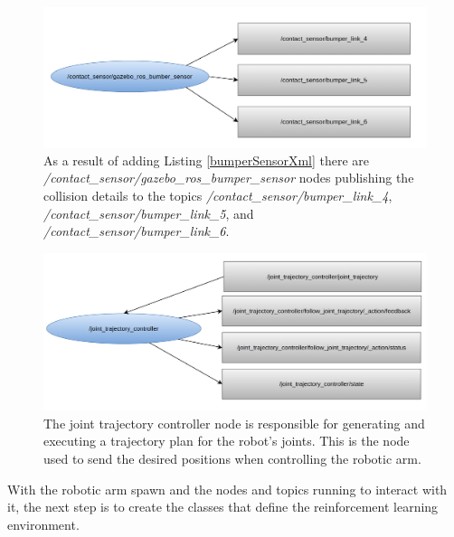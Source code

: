 \documentclass[12pt,oneside]{article}
\begin{document}
\begin{figure}[H]
\centering
\includegraphics[width=0.95\linewidth]{rosgraph03_new}
\caption{As a result of adding Listing \ref{bumperSensorXml} there are \textit{/contact\_sensor/gazebo\_ros\_bumper\_sensor} nodes publishing the collision details to the topics \textit{/contact\_sensor/bumper\_link\_4}, \textit{/contact\_sensor/bumper\_link\_5}, and\textit{ /contact\_sensor/bumper\_link\_6}. }
\label{fig:rosgraph03}
\end{figure}

\begin{figure}[H]
\centering
\includegraphics[width=0.95\linewidth]{rosgraph04_new}
\caption{The joint trajectory controller node is responsible for generating and executing a trajectory plan for the robot's joints. This is the node used to send the desired positions when controlling the robotic arm.}
\label{fig:rosgraph04}
\end{figure}

With the robotic arm spawn and the nodes and topics running to interact with it, the next step is to create the classes that define the reinforcement learning environment.
\end{document}
